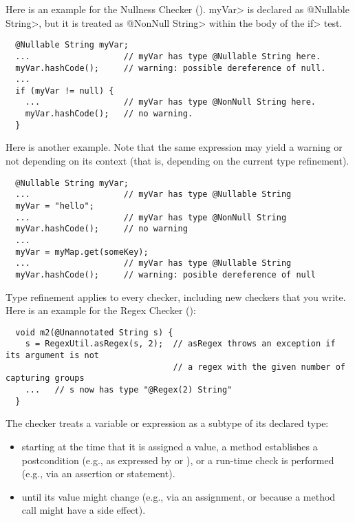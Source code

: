 
Here is an example for the Nullness Checker
().
\<myVar> is declared as \<@Nullable String>, but
it is treated as \<@NonNull String> within the body of the \<if> test.

\begin{Verbatim}
  @Nullable String myVar;
  ...                   // myVar has type @Nullable String here.
  myVar.hashCode();     // warning: possible dereference of null.
  ...
  if (myVar != null) {
    ...                 // myVar has type @NonNull String here.
    myVar.hashCode();   // no warning.
  }
\end{Verbatim}

Here is another example.
Note that the same expression may yield a
warning or not depending on its context (that is, depending on the current
type refinement).

\begin{Verbatim}
  @Nullable String myVar;
  ...                   // myVar has type @Nullable String
  myVar = "hello";
  ...                   // myVar has type @NonNull String
  myVar.hashCode();     // no warning
  ...
  myVar = myMap.get(someKey);
  ...                   // myVar has type @Nullable String
  myVar.hashCode();     // warning: posible dereference of null
\end{Verbatim}

Type refinement applies to every checker, including new
checkers that you write.  Here is an example for the Regex Checker
():

\begin{Verbatim}
  void m2(@Unannotated String s) {
    s = RegexUtil.asRegex(s, 2);  // asRegex throws an exception if its argument is not
                                  // a regex with the given number of capturing groups
    ...   // s now has type "@Regex(2) String"
  }
\end{Verbatim}



The checker treats a variable or expression as a subtype of its declared type:
\begin{itemize}
\item
  starting at the time that
  it is assigned a value,
  a method establishes a postcondition (e.g., as
  expressed by  or
  ), or
  a run-time check is performed (e.g., via an assertion or
   statement).
\item
until its value might change (e.g.,
via an assignment, or because a method call might have a side effect).
\end{itemize}

